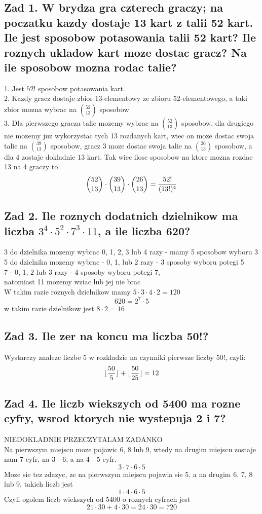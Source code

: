 \documentclass{article}
\begin{document}
\ttfamily
\subsection*{Zad 1. W brydza gra czterech graczy; na poczatku kazdy dostaje 13 kart z talii 52 kart.\\
Ile jest sposobow potasowania talii 52 kart? Ile roznych ukladow kart moze dostac gracz? Na ile sposobow mozna rodac talie?}
    1. Jest $52!$ sposobow potasowania kart.\bigskip\\
    2. Kazdy gracz dostaje zbior 13-elementowy ze zbioru 52-elementowego, a taki zbior mozna wybrac na ${52\choose13}$ sposobow\bigskip\\
    3. Dla pierwszego gracza talie mozemy wybrac na ${52\choose 13}$ sposobow, dla drugiego nie mozemy juz wykorzystac tych 13 rozdanych kart, wiec on moze dostac swoja talie na ${39\choose13}$ sposobow, gracz 3 moze dostac swoja talie na $26\choose 13$ sposobow, a dla 4 zostaje dokladnie $13$ kart. Tak wiec ilosc sposobow na ktore mozna rozdac 13 na 4 graczy to
        $${52\choose13}\cdot{39\choose13}\cdot{26\choose13}={52!\over(13!)^4}$$
\subsection*{Zad 2. Ile roznych dodatnich dzielnikow ma liczba $3^4\cdot5^2\cdot7^3\cdot11$, a ile liczba 620?}
    3 do dzielnika mozemy wybrac 0, 1, 2, 3 lub 4 razy - mamy 5 sposobow wyboru 3\smallskip\\
    5 do dzielnika mozemy wybrac - 0, 1, lub 2 razy - 3 sposoby wyboru potegi 5\smallskip\\
    7 - 0, 1, 2 lub 3 razy - 4 sposoby wyboru potegi 7,\smallskip\\
    natomiast 11 mozemy wziac lub jej nie brac\medskip\\
    W takim razie roznych dzielnikow mamy $5\cdot3\cdot4\cdot2=120$\bigskip\\
    $$620=2^7\cdot5$$
    w takim razie dzielnikow jest $8\cdot 2=16$
\subsection*{Zad 3. Ile zer na koncu ma liczba 50!?}
    Wystarczy znalezc liczbe $5$ w rozkladzie na czynniki pierwsze liczby $50!$, czyli:
    $$\lfloor{50\over5}\rfloor + \lfloor{50\over25}\rfloor=12$$
\subsection*{Zad 4. Ile liczb wiekszych od 5400 ma rozne cyfry, wsrod ktorych nie wystepuja 2 i 7?}
NIEDOKLADNIE PRZECZYTALAM ZADANKO\\
    Na pierwszym miejscu moze pojawic 6, 8 lub 9, wtedy na drugim miejscu zostaje nam 7 cyfr, na 3 - 6, a na 4 - 5 cyfr.
    $$3\cdot7\cdot6\cdot5$$
    Moze sie tez zdazyc, ze na pierwszym miejscu pojawia sie 5, a na drugim 6, 7, 8 lub 9, takich liczb jest
    $$1\cdot4\cdot6\cdot5$$
    Czyli ogolem liczb wiekszych od 5400 o roznych cyfrach jest
    $$21\cdot30+4\cdot30=24\cdot30=720$$
\end{document}

